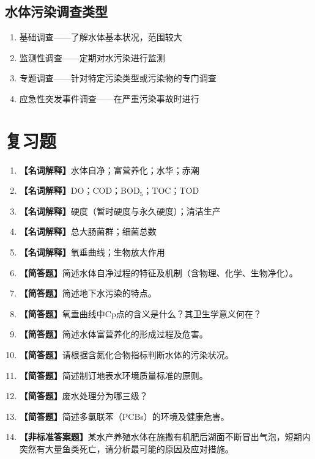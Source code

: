 \documentclass[10pt,a4paper,oneside]{ctexbook}
\begin{document}
\subsection{水体污染调查类型}
\begin{enumerate}[leftmargin=*]
    \item 基础调查——了解水体基本状况，范围较大
    \item 监测性调查——定期对水污染进行监测
    \item 专题调查——针对特定污染类型或污染物的专门调查
    \item 应急性突发事件调查——在严重污染事故时进行
\end{enumerate}

\section{复习题}

\begin{enumerate}[leftmargin=*, itemsep=8pt]
    \item \textbf{【名词解释】}水体自净；富营养化；水华；赤潮
    \item \textbf{【名词解释】}DO；COD；BOD$_5$；TOC；TOD
    \item \textbf{【名词解释】}硬度（暂时硬度与永久硬度）；清洁生产
    \item \textbf{【名词解释】}总大肠菌群；细菌总数
    \item \textbf{【名词解释】}氧垂曲线；生物放大作用
    \item \textbf{【简答题】}简述水体自净过程的特征及机制（含物理、化学、生物净化）。
    \item \textbf{【简答题】}简述地下水污染的特点。
    \item \textbf{【简答题】}氧垂曲线中Cp点的含义是什么？其卫生学意义何在？
    \item \textbf{【简答题】}简述水体富营养化的形成过程及危害。
    \item \textbf{【简答题】}请根据含氮化合物指标判断水体的污染状况。
    \item \textbf{【简答题】}简述制订地表水环境质量标准的原则。
    \item \textbf{【简答题】}废水处理分为哪三级？
    \item \textbf{【简答题】}简述多氯联苯（PCBs）的环境及健康危害。
    \item \textbf{【非标准答案题】}某水产养殖水体在施撒有机肥后湖面不断冒出气泡，短期内突然有大量鱼类死亡，请分析最可能的原因及应对措施。
\end{enumerate}
\end{document}
